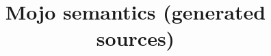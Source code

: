 \documentclass[11pt,a4paper]{article}
\begin{document}
\title{Mojo semantics (generated sources)}
\maketitle

\end{document}
